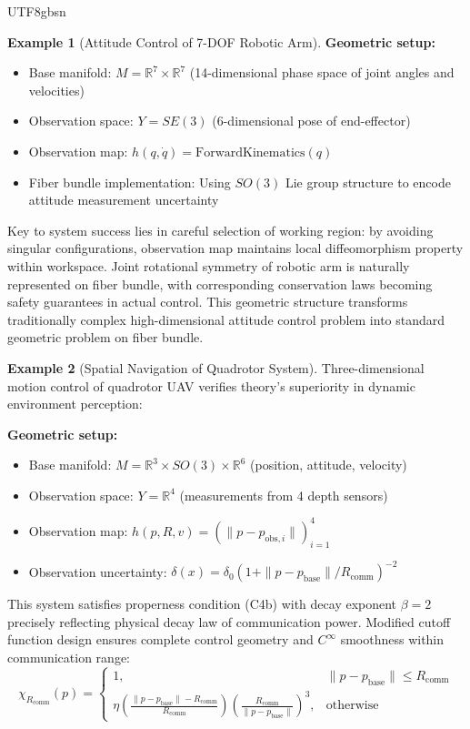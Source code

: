 \documentclass[a4paper,12pt]{extarticle}
\theoremstyle{definition}
\newtheorem{example}{Example}
\begin{document}
\begin{CJK}{UTF8}{gbsn}
\begin{example}[Attitude Control of 7-DOF Robotic Arm]
\textbf{Geometric setup:}
\begin{itemize}
\item Base manifold: $M = \mathbb{R}^7 \times \mathbb{R}^7$ (14-dimensional phase space of joint angles and velocities)
\item Observation space: $Y = SE(3)$ (6-dimensional pose of end-effector)
\item Observation map: $h(q, \dot{q}) = \text{ForwardKinematics}(q)$
\item Fiber bundle implementation: Using $SO(3)$ Lie group structure to encode attitude measurement uncertainty
\end{itemize}

Key to system success lies in careful selection of working region: by avoiding singular configurations, observation map maintains local diffeomorphism property within workspace. Joint rotational symmetry of robotic arm is naturally represented on fiber bundle, with corresponding conservation laws becoming safety guarantees in actual control. This geometric structure transforms traditionally complex high-dimensional attitude control problem into standard geometric problem on fiber bundle.
\end{example}

\begin{example}[Spatial Navigation of Quadrotor System]
Three-dimensional motion control of quadrotor UAV verifies theory's superiority in dynamic environment perception:

\textbf{Geometric setup:}
\begin{itemize}
\item Base manifold: $M = \mathbb{R}^3 \times SO(3) \times \mathbb{R}^6$ (position, attitude, velocity)
\item Observation space: $Y = \mathbb{R}^4$ (measurements from 4 depth sensors)
\item Observation map: $h(p, R, v) = (\|p - p_{\text{obs},i}\|)_{i=1}^4$
\item Observation uncertainty: $\delta(x) = \delta_0(1 + \|p - p_{\text{base}}\|/R_{\text{comm}})^{-2}$
\end{itemize}

This system satisfies properness condition (C4b) with decay exponent $\beta = 2$ precisely reflecting physical decay law of communication power. Modified cutoff function design ensures complete control geometry and $C^\infty$ smoothness within communication range:
$$\chi_{R_{\text{comm}}}(p) = \begin{cases}
1, & \|p - p_{\text{base}}\| \leq R_{\text{comm}} \\
\eta\left(\frac{\|p - p_{\text{base}}\| - R_{\text{comm}}}{R_{\text{comm}}}\right) \left(\frac{R_{\text{comm}}}{\|p - p_{\text{base}}\|}\right)^3, & \text{otherwise}
\end{cases}$$


\end{example}
\end{CJK}
\end{document}
